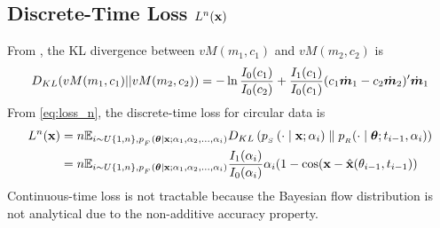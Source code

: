 \subsection{Discrete-Time Loss \texorpdfstring{$L^{n}(\operatorname{\mathbf{x}})$}{}}\label{appd:cir_loss}
From \citet{kitagawa2022kldvm}, the KL divergence between $vM(m_1,c_1)$ and $vM(m_2,c_2)$ is
\begin{equation}\label{eq:kld_vm}
    D_{KL}(vM(m_1,c_1)||vM(m_2,c_2))=-\ln\frac{I_0(c_1)}{I_0(c_2)}+\frac{I_1(c_1)}{I_0(c_1)}(c_1\dot{\bm{m}}_1-c_2\dot{\bm{m}}_2)'\dot{\bm{m}}_1
\end{equation}
From \cref{eq:loss_n}, the discrete-time loss for circular data is
\begin{align}\label{disc_t_loss_exp}
L^{n}(\operatorname{\mathbf{x}}) &= n \mathbb{E}_{i \sim U\{1,n\}, p_{_F}(\boldsymbol{\theta} \mid \operatorname{\mathbf{x}} ; \alpha_1,\alpha_2,\dots,\alpha_i)} D_{KL}\left(p_{_S}\left(\cdot \mid \operatorname{\mathbf{x}} ; \alpha_{i}\right) \parallel p_{_R}(\cdot \mid \boldsymbol{\theta}; t_{i-1}, \alpha_{i})\right)\\
&=n \mathbb{E}_{i \sim U\{1,n\}, p_{_F}(\boldsymbol{\theta} \mid \operatorname{\mathbf{x}} ; \alpha_1,\alpha_2,\dots,\alpha_i)} \frac{I_1(\alpha_i)}{I_0(\alpha_i)}\alpha_i(1-\cos(\bold{x}-\hat{\bold{x}}(\theta_{i-1},t_{i-1}))
\end{align}
Continuous-time loss is not tractable because the Bayesian flow distribution is not analytical due to the non-additive accuracy property.

